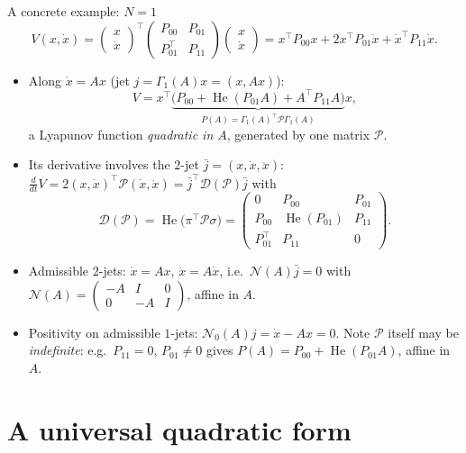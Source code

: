 \documentclass[10pt,aspectratio=169]{beamer}
\newcommand{\tr}{^{\top}}
\newcommand{\PP}{\mathcal{P}}
\newcommand{\DD}{\mathcal{D}}
\newcommand{\NN}{\mathcal{N}}
\DeclareMathOperator{\He}{He}
\begin{document}
\begin{frame}{A concrete example: $N=1$}
\[
V(x,\dot x)=\begin{pmatrix}x\\\dot x\end{pmatrix}\tr\begin{pmatrix}P_{00}&P_{01}\\P_{01}\tr&P_{11}\end{pmatrix}\begin{pmatrix}x\\\dot x\end{pmatrix}
=x\tr P_{00}x+2x\tr P_{01}\dot x+\dot x\tr P_{11}\dot x .
\]
\begin{itemize}
\item Along $\dot x=Ax$ (jet $j=\Gamma_1(A)x=(x,Ax)$):
\[
V=x\tr\underbrace{\big(P_{00}+\He(P_{01}A)+A\tr P_{11}A\big)}_{P(A)=\Gamma_1(A)\tr\PP\Gamma_1(A)}x ,
\]
a Lyapunov function \emph{quadratic in $A$}, generated by one matrix $\PP$.
\item Its derivative involves the $2$-jet $\bar j=(x,\dot x,\ddot x)$: $\frac{d}{dt}V=2(x,\dot x)\tr\PP(\dot x,\ddot x)=\bar j\tr\DD(\PP)\bar j$ with
\[
\DD(\PP)=\He\big(\pi\tr\PP\sigma\big)=\begin{pmatrix}0&P_{00}&P_{01}\\P_{00}&\He(P_{01})&P_{11}\\P_{01}\tr&P_{11}&0\end{pmatrix}.
\]
\item Admissible $2$-jets: $\dot x=Ax$, $\ddot x=A\dot x$, i.e.\ $\NN(A)\bar j=0$ with $\NN(A)=\begin{pmatrix}-A&I&0\\0&-A&I\end{pmatrix}$, affine in $A$.
\item Positivity on admissible $1$-jets: $\NN_0(A)j=\dot x-Ax=0$. Note $\PP$ itself may be \emph{indefinite}: e.g.\ $P_{11}=0$, $P_{01}\ne0$ gives $P(A)=P_{00}+\He(P_{01}A)$, affine in $A$.
\end{itemize}
\end{frame}

\section{A universal quadratic form}
\end{document}
